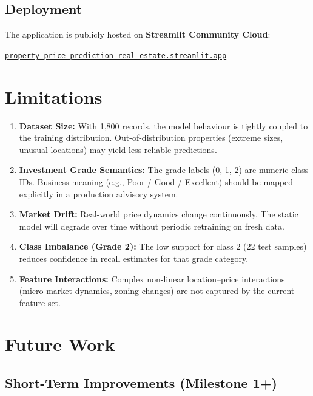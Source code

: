 \documentclass[12pt,a4paper]{article}
\begin{document}
\subsection{Deployment}

The application is publicly hosted on \textbf{Streamlit Community Cloud}:

\begin{center}
\href{https://property-price-prediction-real-estate.streamlit.app/}{\texttt{property-price-prediction-real-estate.streamlit.app}}
\end{center}

\section{Limitations}

\begin{enumerate}
    \item \textbf{Dataset Size:} With 1,800 records, the model behaviour is tightly coupled to
          the training distribution. Out-of-distribution properties (extreme sizes, unusual
          locations) may yield less reliable predictions.
    \item \textbf{Investment Grade Semantics:} The grade labels (0, 1, 2) are numeric class IDs.
          Business meaning (e.g., Poor / Good / Excellent) should be mapped explicitly in a
          production advisory system.
    \item \textbf{Market Drift:} Real-world price dynamics change continuously. The static model
          will degrade over time without periodic retraining on fresh data.
    \item \textbf{Class Imbalance (Grade 2):} The low support for class 2 (22 test samples)
          reduces confidence in recall estimates for that grade category.
    \item \textbf{Feature Interactions:} Complex non-linear location--price interactions
          (micro-market dynamics, zoning changes) are not captured by the current feature set.
\end{enumerate}

\section{Future Work}

\subsection{Short-Term Improvements (Milestone 1+)}
\end{document}
